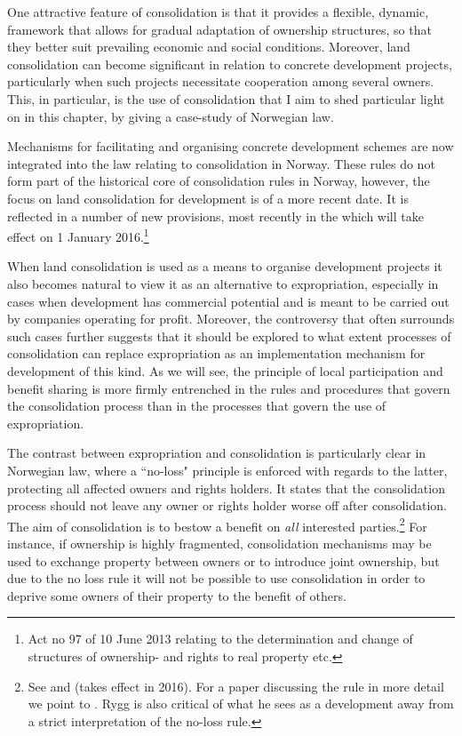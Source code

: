 {One attractive feature of consolidation is that it provides a flexible, dynamic, framework that allows for gradual adaptation of ownership structures, so that they better suit prevailing economic and social conditions. Moreover, land consolidation can become significant in relation to concrete development projects, particularly when such projects necessitate cooperation among several owners. This, in particular, is the use of consolidation that I aim to shed particular light on in this chapter, by giving a case-study of Norwegian law.

Mechanisms for facilitating and organising concrete development schemes are now integrated into the law relating to consolidation in Norway. These rules do not form part of the historical core of consolidation rules in Norway, however, the focus on land consolidation for development is of a more recent date. It is reflected in a number of new provisions, most recently in the \cite{lca13} which will take effect on 1 January 2016.\footnote{Act no 97 of 10 June 2013 relating to the determination and change of structures of ownership- and rights to real property etc.}

When land consolidation is used as a means to organise development projects it also becomes natural to view it as an alternative to expropriation, especially in cases when development has commercial potential and is meant to be carried out by companies operating for profit. Moreover, the controversy that often surrounds such cases further suggests that it should be explored to what extent processes of consolidation can replace expropriation as an implementation mechanism for development of this kind. As we will see, the principle of local participation and benefit sharing is more firmly entrenched in the rules and procedures that govern the consolidation process than in the processes that govern the use of expropriation. 

The contrast between expropriation and consolidation is particularly clear in Norwegian law, where a ``no-loss" principle is enforced with regards to the latter, protecting all affected owners and rights holders. It states that the consolidation process should not leave any owner or rights holder worse off after consolidation. The aim of consolidation is to bestow a benefit on \emph{all} interested parties.\footnote{See \cite[3 a)]{lca79} and \cite[3-18]{lca13} (takes effect in 2016). For a paper discussing the rule in more detail we point to \cite{rygg98}. Rygg is also critical of what he sees as a development away from a strict interpretation of the no-loss rule.} For instance, if ownership is highly fragmented, consolidation mechanisms may be used to exchange property between owners or to introduce joint ownership, but due to the no loss rule it will not be possible to use consolidation in order to deprive some owners of their property to the benefit of others.

}
